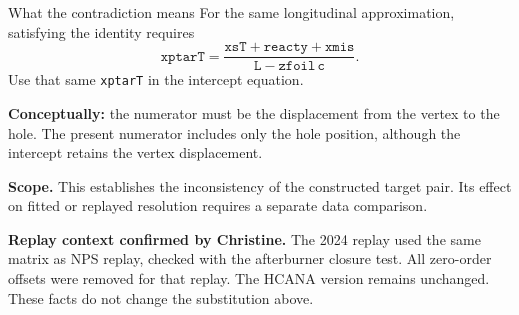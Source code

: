 \documentclass[aspectratio=169,11pt]{beamer}
\newcommand{\code}[1]{\texttt{#1}}
\newcommand{\cv}[1]{\mathtt{#1}}
\begin{document}
\begin{frame}{What the contradiction means}
For the same longitudinal approximation, satisfying the identity requires
\[
\boxed{\cv{xptarT}=\frac{\cv{xsT}+\cv{reacty}+\cv{xmis}}
{\cv{L}-\cv{zfoil}\,\cv{c}}.}
\]
Use that same \code{xptarT} in the intercept equation.

\vspace{3mm}
\textbf{Conceptually:} the numerator must be the displacement from the vertex to the hole. The present numerator includes only the hole position, although the intercept retains the vertex displacement.

\vspace{3mm}
\small
\textbf{Scope.} This establishes the inconsistency of the constructed target pair. Its effect on fitted or replayed resolution requires a separate data comparison.

\vspace{3mm}
\footnotesize
\textbf{Replay context confirmed by Christine.} The 2024 replay used the same matrix as NPS replay, checked with the afterburner closure test. All zero-order offsets were removed for that replay. The HCANA version remains unchanged. These facts do not change the substitution above.
\end{frame}
\end{document}
